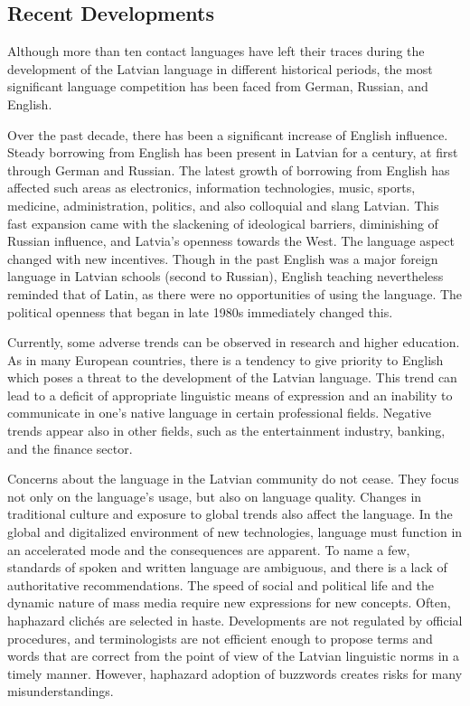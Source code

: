 \begin{multicols}{2}
\subsection{Recent Developments}

Although more than ten contact languages have left their traces during the development of the Latvian language in different historical periods, the most significant language competition has been faced from German, Russian, and English.

Over the past decade, there has been a significant increase of English influence.  Steady borrowing from English has been present in Latvian for a century, at first through German and Russian.  The latest growth of borrowing from English has affected such areas as electronics, information technologies, music, sports, medicine, administration, politics, and also colloquial and slang Latvian.  This fast expansion came with the slackening of ideological barriers, diminishing of Russian influence, and Latvia's openness towards the West.  The language aspect changed with new incentives.  Though in the past English was a major foreign language in Latvian schools (second to Russian), English teaching nevertheless reminded that of Latin, as there were no opportunities of using the language.  The political openness that began in late 1980s immediately changed this.

Currently, some adverse trends can be observed in research and higher education.  As in many European countries, there is a tendency to give priority to English which poses a threat to the development of the Latvian language.  This trend can lead to a deficit of appropriate linguistic means of expression and an inability to communicate in one's native language in certain professional fields.  Negative trends appear also in other fields, such as the entertainment industry, banking, and the finance sector.

Concerns about the language in the Latvian community do not cease.  They focus not only on the language's usage, but also on language quality.  Changes in traditional culture and exposure to global trends also affect the language.  In the global and digitalized environment of new technologies, language must function in an accelerated mode and the consequences are apparent.  To name a few, standards of spoken and written language are ambiguous, and there is a lack of authoritative recommendations.  The speed of social and political life and the dynamic nature of mass media require new expressions for new concepts.  Often, haphazard clichés are selected in haste.  Developments are not regulated by official procedures, and terminologists are not efficient enough to propose terms and words that are correct from the point of view of the Latvian linguistic norms in a timely manner.  However, haphazard adoption of buzzwords creates risks for many misunderstandings.


\end{multicols}
